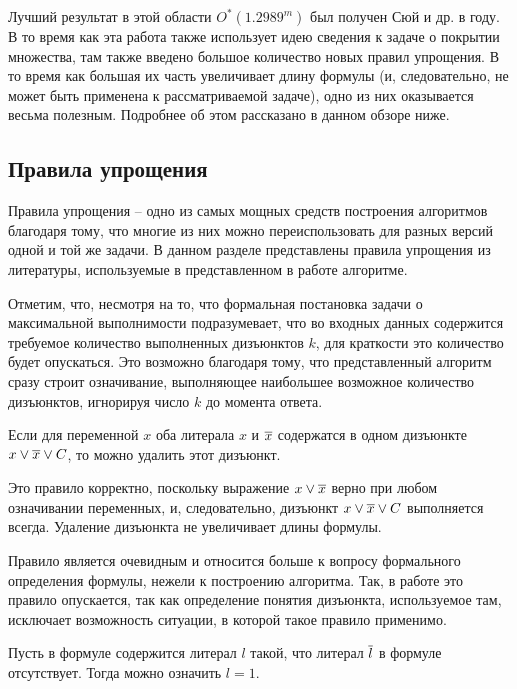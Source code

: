 Лучший результат в этой области $O^*(1.2989^m)$ был получен Сюй и др. \cite{xu19} в \citeyear{xu19} году. В то время как эта работа также использует идею сведения к задаче о покрытии множества, там также введено большое количество новых правил упрощения. В то время как большая их часть увеличивает длину формулы (и, следовательно, не может быть применена к рассматриваемой задаче), одно из них оказывается весьма полезным. Подробнее об этом рассказано в данном обзоре ниже.

\subsection{Правила упрощения}
\label{subsec:literature-review:rrules}

\firstpar{}Правила упрощения -- одно из самых мощных средств построения алгоритмов благодаря тому, что многие из них можно переиспользовать для разных версий одной и той же задачи. В данном разделе представлены правила упрощения из литературы, используемые в представленном в работе алгоритме.

Отметим, что, несмотря на то, что формальная постановка задачи о максимальной выполнимости подразумевает, что во входных данных содержится требуемое количество выполненных дизъюнктов $k$, для краткости это количество будет опускаться. Это возможно благодаря тому, что представленный алгоритм сразу строит означивание, выполняющее наибольшее возможное количество дизъюнктов, игнорируя число $k$ до момента ответа.

\begin{rrule}
 Если для переменной $x$ оба литерала $x$ и $\overline{x}$ содержатся в одном дизъюнкте $x \vee \overline{x} \vee C$, то можно удалить этот дизъюнкт.
 \label{rrule:common:complementary}
\end{rrule}

Это правило корректно, поскольку выражение $x \vee \overline{x}$ верно при любом означивании переменных, и, следовательно, дизъюнкт $x \vee \overline{x} \vee C$ выполняется всегда. Удаление дизъюнкта не увеличивает длины формулы.

Правило является очевидным и относится больше к вопросу формального определения формулы, нежели к построению алгоритма. Так, в работе \cite{bansal99} это правило опускается, так как определение понятия дизъюнкта, используемое там, исключает возможность ситуации, в которой такое правило применимо.

\begin{rrule}
 Пусть в формуле содержится литерал $l$ такой, что литерал $\overline{l}$ в формуле отсутствует. Тогда можно означить $l = 1$.
 \label{rrule:common:i0}
\end{rrule}


